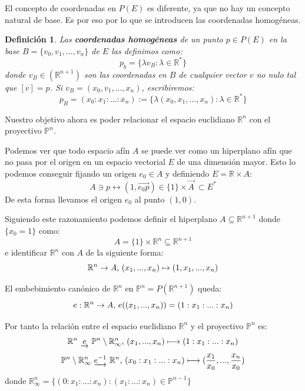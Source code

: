 \documentclass[a4paper,11pt, oneside]{book}
\newtheorem{defi}{Definición}
\begin{document}
El concepto de coordenadas en $P(E)$ es diferente, ya que no hay un concepto natural de base. Es por eso por lo que se introducen las coordenadas homogéneas.
\begin{defi}
	Las \textbf{coordenadas homogéneas} de un punto $p \in P(E)$ en la base $B = \{v_0,v_1,...,v_n\}$ de $E$ las definimos como:
	\begin{equation}
		p_b = \{\lambda v_B: \lambda \in \mathbb R^*\}
	\end{equation}
	donde $v_B \in (\mathbb R^{n+1})$ son las coordenadas en $B$ de cualquier vector $v$ no nulo tal que $[v] = p$. Si $v_B = (x_0,v_1,...,x_n)$, escribiremos:
	\begin{equation}
		p_B = (x_0:x_1:...:x_n) := \{\lambda(x_0,x_1,...,x_n): \lambda \in \mathbb R^*\}
	\end{equation}
\end{defi}

Nuestro objetivo ahora es poder relacionar el espacio euclidiano $\mathbb R^n$ con el proyectivo $\mathbb P^n$. 

Podemos ver que todo espacio afín $A$ se puede ver como un hiperplano afín que no pasa por el origen en un espacio vectorial $E$ de una dimensión mayor. Esto lo podemos conseguir fijando un origen $e_0 \in A$ y definiendo $E = \mathbb R \times A$:
\begin{equation}
	A \ni p \longleftrightarrow (1, \overrightarrow{e_0p}) \in \{1\}\times\overrightarrow{A} \ \subset E^*
\end{equation}
De esta forma llevamos el origen $e_0$ al punto $(1,0)$. 

Siguiendo este razonamiento podemos definir el hiperplano $A \subseteq \mathbb R^{n+1}$ donde $\{x_0 = 1\}$ como:
\begin{equation}
	A = \{1\} \times \mathbb R^n \subseteq \mathbb R^{n+1}
\end{equation}
e identificar $\mathbb R^n$ con $A$ de la siguiente forma:
\begin{equation}
	\mathbb R^n \rightarrow A \textup{,  } (x_1,...,x_n) \mapsto (1,x_1,...,x_n)
\end{equation}

El embebimiento canónico de $\mathbb R^n$ en $\mathbb P^n = P(\mathbb R^{n+1})$ queda:
\begin{equation}
	e: \mathbb R^n \rightarrow A \textup{,   } e((x_1,...,x_n)) = (1:x_1:...:x_n)
\end{equation}

Por tanto la relación entre el espacio euclidiano $\mathbb R^n$ y el proyectivo $\mathbb P^n$ es:
\begin{equation}
	\mathbb R^n \textup{ } \underrightarrow{e} \textup{ } \mathbb P^n \setminus \mathbb R^n_{\infty}\textup{,     } (x_1,...,x_n) \longmapsto (1:x_1:...:x_n)
\end{equation}
\begin{equation}
	\mathbb P^n \setminus \mathbb R^n_{\infty} \textup{ }   \underrightarrow{e^{-1}} \textup{ }\mathbb R^n \textup{,     } (x_0:x_1:...:x_n) \longmapsto (\frac{x_1}{x_0},...,\frac{x_n}{x_0})
\end{equation}
donde $\mathbb R^n_{\infty} = \{(0:x_1:...:x_n) : (x_1:...:x_n) \in  \mathbb P^{n-1}\}$
\end{document}
